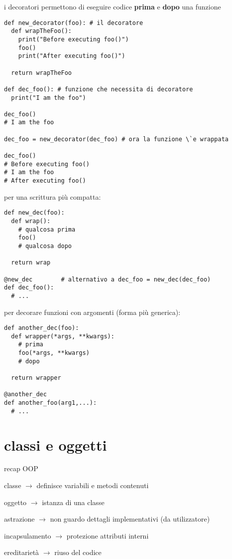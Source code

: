 i decoratori permettono di eseguire codice \textbf{prima} e \textbf{dopo} una funzione

\begin{verbatim}
def new_decorator(foo): # il decoratore
  def wrapTheFoo():
    print("Before executing foo()")
    foo()
    print("After executing foo()")
  
  return wrapTheFoo

def dec_foo(): # funzione che necessita di decoratore
  print("I am the foo")
  
dec_foo()
# I am the foo

dec_foo = new_decorator(dec_foo) # ora la funzione \`e wrappata

dec_foo()
# Before executing foo()
# I am the foo
# After executing foo()
\end{verbatim}

per una scrittura pi\`u compatta:

\begin{verbatim}
def new_dec(foo):
  def wrap():
    # qualcosa prima
    foo()
    # qualcosa dopo
  
  return wrap

@new_dec		# alternativo a dec_foo = new_dec(dec_foo)
def dec_foo():
  # ...
\end{verbatim}

per decorare funzioni con argomenti (forma pi\`u generica):

\begin{verbatim}
def another_dec(foo):
  def wrapper(*args, **kwargs):
    # prima
    foo(*args, **kwargs)
    # dopo
    
  return wrapper

@another_dec
def another_foo(arg1,...):
  # ...
\end{verbatim}

\section{classi e oggetti}

recap OOP

classe $\rightarrow$ definisce variabili e metodi contenuti

oggetto $\rightarrow$ istanza di una classe

astrazione $\rightarrow$ non guardo dettagli implementativi (da utilizzatore)

incapsulamento $\rightarrow$ protezione attributi interni

ereditariet\`a $\rightarrow$ riuso del codice


